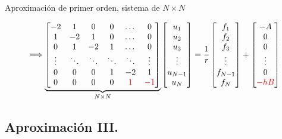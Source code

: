 \documentclass{beamer}
\begin{document}
\begin{frame}{Aproximación de primer orden, sistema de $N \times N$}
\begin{footnotesize}
		\[
		\Longrightarrow
		\underbrace{
			\left[
			\begin{matrix}
			-2 & 1 & 0 & 0 & \dots & 0  \\
			1 & -2 & 1 & 0 & \dots & 0  \\
			0 & 1 & -2 & 1 & \dots & 0  \\
			\vdots & \ddots & \ddots & \ddots & \ddots & \vdots \\
			0 & 0 & 0 & 1 & -2 & 1   \\
			0 & 0 & 0 & 0 & \textcolor{red}{1} & \textcolor{red}{-1}    
			\end{matrix}
			\right] }_{N \times N}
		\left[
		\begin{matrix}
		u_1 \\ u_2 \\ u_3 \\ \vdots \\ u_{N-1} \\ u_N
		\end{matrix}
		\right]= 
		\frac{1}{r} \left[
		\begin{matrix}
		f_1 \\ f_2 \\ f_3 \\ \vdots \\ f_{N-1} \\ f_N
		\end{matrix}
		\right] +
		\left[
		\begin{matrix}
		-A \\ 0 \\ 0 \\ \vdots \\ 0 \\ \textcolor{red}{-hB}
		\end{matrix}
		\right]
		\]
		
	\end{footnotesize}
	
\end{frame}

\subsection{Aproximación III.}
\end{document}
